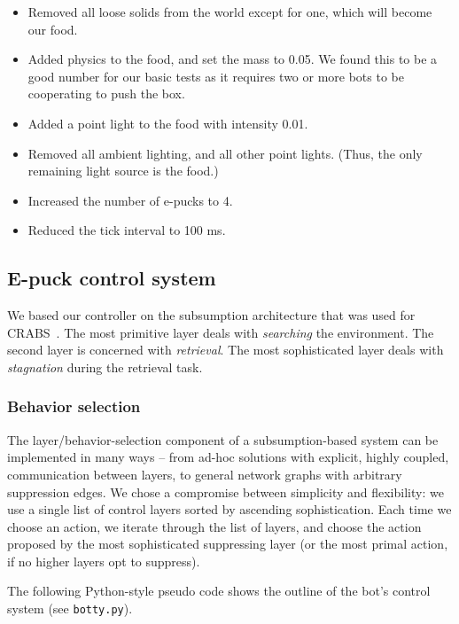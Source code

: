 \documentclass[a4paper,10pt]{article}
\newcommand{\numbots}{4}
\newcommand{\foodmass}{0.05}
\newcommand{\lightintensity}{0.01}
\newcommand{\tickinterval}{100 ms}
\begin{document}
\begin{itemize}
    \item Removed all loose solids from the world except for one, which will
    become our food.
    \item Added physics to the food, and set the mass to \foodmass.
    We found this to be a good number for our basic tests as it
    requires two or more bots to be cooperating to push the box.
    \item Added a point light to the food with intensity \lightintensity.
    \item Removed all ambient lighting, and all other point lights. (Thus, the
    only remaining light source is the food.)
    \item Increased the number of e-pucks to \numbots.
    \item Reduced the tick interval to \tickinterval.
\end{itemize}


\subsection{E-puck control system}
\label{sec:a2}

We based our controller on the subsumption architecture that was used for
CRABS~\cite{berg2011}. The most primitive layer deals with \emph{searching}
the environment. The second layer is concerned with \emph{retrieval}. The most
sophisticated layer deals with \emph{stagnation} during the retrieval task.

\subsubsection{Behavior selection}
The layer/behavior-selection component of a subsumption-based system can be
implemented in many ways -- from ad-hoc solutions with explicit, highly
coupled, communication between layers, to general network graphs with
arbitrary suppression edges. We chose a compromise between simplicity and
flexibility: we use a single list of control layers sorted by ascending
sophistication. Each time we choose an action, we iterate through the list of
layers, and choose the action proposed by the most sophisticated suppressing
layer (or the most primal action, if no higher layers opt to suppress). 

The following Python-style pseudo code shows the outline of the
bot's control system (see \texttt{botty.py}).

\clearpage
\end{document}
